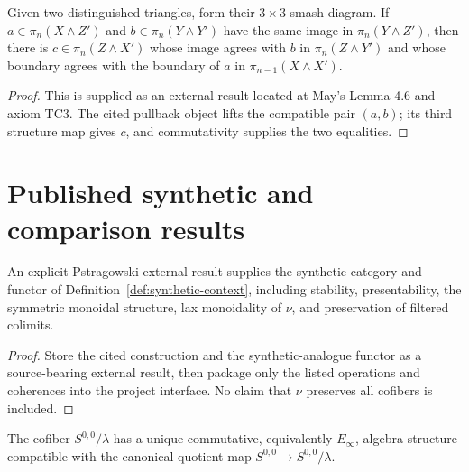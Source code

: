 \begin{theorem}
  \label{thm:external-may-smash-boundary}
  \notready
  Given two distinguished triangles, form their $3\times3$ smash diagram.  If
  $a\in\pi_n(X\wedge Z')$ and $b\in\pi_n(Y\wedge Y')$ have the same image in
  $\pi_n(Y\wedge Z')$, then there is
  $c\in\pi_n(Z\wedge X')$ whose image agrees with $b$ in
  $\pi_n(Z\wedge Y')$ and whose boundary agrees with the boundary of $a$ in
  $\pi_{n-1}(X\wedge X')$.
\end{theorem}

\begin{proof}
  This is supplied as an external result located at May's Lemma 4.6 and axiom
  TC3.  The cited pullback object lifts the compatible pair $(a,b)$; its third
  structure map gives $c$, and commutativity supplies the two equalities.
\end{proof}

\section{Published synthetic and comparison results}

\begin{theorem}
  \label{thm:external-synthetic-foundation}
  \notready
  An explicit Pstragowski external result supplies the synthetic category and
  functor of Definition~\ref{def:synthetic-context}, including stability,
  presentability, the symmetric monoidal structure, lax monoidality of $\nu$,
  and preservation of filtered colimits.
\end{theorem}

\begin{proof}
  Store the cited construction and the synthetic-analogue functor as a
  source-bearing external result, then package only the listed operations and
  coherences into the project interface.  No claim that $\nu$ preserves all
  cofibers is included.
\end{proof}

\begin{theorem}
  \label{thm:external-lambda-quotient-ring}
  \notready
  The cofiber $S^{0,0}/\lambda$ has a unique commutative, equivalently
  $E_\infty$, algebra structure compatible with the canonical quotient map
  $S^{0,0}\to S^{0,0}/\lambda$.
\end{theorem}

